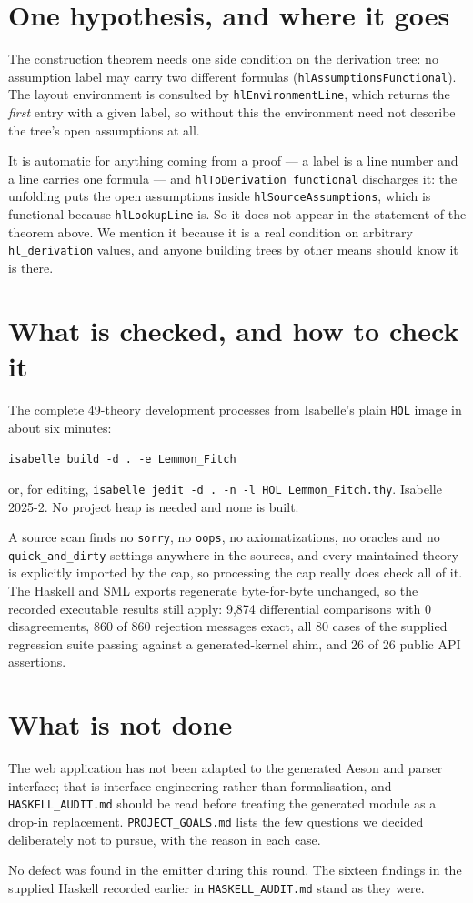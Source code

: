\documentclass[11pt]{article}
\theoremstyle{plain}
\newcommand{\isa}[1]{\texttt{\small #1}}
\begin{document}
\section{One hypothesis, and where it goes}

The construction theorem needs one side condition on the derivation tree:
no assumption label may carry two different formulas
(\isa{hlAssumptionsFunctional}). The layout environment is consulted by
\isa{hlEnvironmentLine}, which returns the \emph{first} entry with a given
label, so without this the environment need not describe the tree's open
assumptions at all.

It is automatic for anything coming from a proof --- a label is a line number
and a line carries one formula --- and \isa{hlToDerivation\_functional}
discharges it: the unfolding puts the open assumptions inside
\isa{hlSourceAssumptions}, which is functional because \isa{hlLookupLine} is.
So it does not appear in the statement of the theorem above. We mention it
because it is a real condition on arbitrary \isa{hl\_derivation} values, and
anyone building trees by other means should know it is there.

\section{What is checked, and how to check it}

The complete 49-theory development processes from Isabelle's plain \isa{HOL}
image in about six minutes:

\begin{center}
\isa{isabelle build -d . -e Lemmon\_Fitch}
\end{center}

\noindent
or, for editing, \isa{isabelle jedit -d . -n -l HOL Lemmon\_Fitch.thy}. Isabelle
2025-2. No project heap is needed and none is built.

A source scan finds no \isa{sorry}, no \isa{oops}, no axiomatizations, no
oracles and no \isa{quick\_and\_dirty} settings anywhere in the sources, and
every maintained theory is explicitly imported by the cap, so processing the cap
really does check all of it. The Haskell and SML exports regenerate
byte-for-byte unchanged, so the recorded executable results still apply:
9{,}874 differential comparisons with 0 disagreements, 860 of 860 rejection
messages exact, all 80 cases of the supplied regression suite passing against a
generated-kernel shim, and 26 of 26 public API assertions.

\section{What is not done}

The web application has not been adapted to the generated Aeson and parser
interface; that is interface engineering rather than formalisation, and
\isa{HASKELL\_AUDIT.md} should be read before treating the generated module as
a drop-in replacement. \isa{PROJECT\_GOALS.md} lists the few questions we
decided deliberately not to pursue, with the reason in each case.

No defect was found in the emitter during this round. The sixteen findings in
the supplied Haskell recorded earlier in \isa{HASKELL\_AUDIT.md} stand as they
were.
\end{document}
